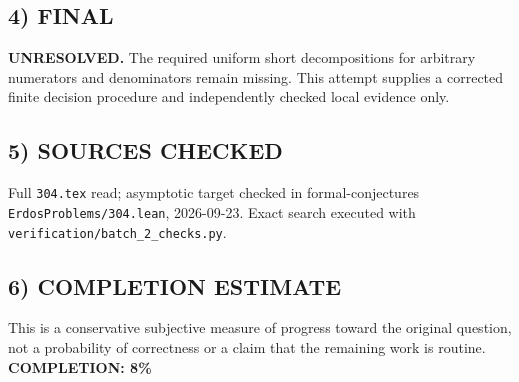 \subsection{4) FINAL}
\textbf{UNRESOLVED.}
The required uniform short decompositions for arbitrary numerators and denominators remain missing. This attempt supplies a corrected finite decision procedure and independently checked local evidence only.
\subsection{5) SOURCES CHECKED}
Full \texttt{304.tex} read; asymptotic target checked in formal-conjectures \texttt{ErdosProblems/304.lean}, 2026-09-23. Exact search executed with \texttt{verification/batch\_2\_checks.py}.
\subsection{6) COMPLETION ESTIMATE}
This is a conservative subjective measure of progress toward the original question, not a probability of correctness or a claim that the remaining work is routine.
\textbf{COMPLETION: 8\%}
